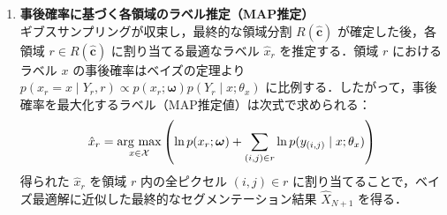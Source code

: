 \documentclass{jsarticle}
\theoremstyle{definition}
\newcommand{\argmax}{\mathop{\rm arg~max}}
\begin{document}
\begin{enumerate}
\begin{proof}
\begin{enumerate}
  結合状態$\bm{c}_{-s}$の段階で$s$と$s'$が同じ領域に属しているか，もしくは$s' = s(c_s = s; リンク先として自身を選択する)$の時，新たな結合によって領域の形状は変わらない．
  \begin{align}
    R(\bm{c}) = R(\bm{c}_{-s})
  \end{align}
  以下，$r=r_s(\bm{c}_{-s})$としたとき，尤度は次のように計算できる．
  \begin{align}
  \prod_{k \in R(\bm{c})} p(Y_k) = p(Y_{r}) \prod_{k \in R(\bm{c}_{-s}) \setminus \{r\}} p(Y_k)
  \end{align}
  よって，
  \begin{align}
  p(c_s=s' \mid \dots)  &\propto p(c_s=s' \mid \hat{T}) p(Y_{r})  \prod_{k \in R(\bm{c}_{-s})} p(Y_k) \\
  &\propto p(c_s=s' \mid \hat{T}) \frac{p(Y_{r})  \prod_{k \in R(\bm{c}_{-s})} p(Y_k)}{p(Y_r)\prod_{k \in R(\bm{c}_{-s})} p(Y_k)} \\
  &= p(c_s=s' \mid \hat{T})
  \end{align}
\end{enumerate}
\end{proof}


  以上の処理を全葉ノードに対して反復し，事後分布への収束を図る．毎ステップ画像全体の尤度を再計算するのではなく，$r_s(\bm{c}_{-s}) \neq r_{s'}(\bm{c}_{-s})$の場合のみ尤度比を計算するため，計算コストを大幅に削減できる．

  \item \textbf{事後確率に基づく各領域のラベル推定（MAP推定）}\\
  ギブスサンプリングが収束し，最終的な領域分割 $R(\hat{\bm{c}})$ が確定した後，各領域 $r \in R(\hat{\bm{c}})$ に割り当てる最適なラベル $\hat{x}_r$ を推定する．領域 $r$ におけるラベル $x$ の事後確率はベイズの定理より $p(x_r = x \mid Y_r, r) \propto p(x_r;\bm{\omega}) p(Y_r \mid x; \theta_x)$ に比例する．したがって，事後確率を最大化するラベル（MAP推定値）は次式で求められる：
  \begin{equation}
    \hat{x}_r = \argmax_{x \in \mathcal{X}} \left( \ln p(x_r;\bm{\omega}) + \sum_{(i,j) \in r} \ln p(y_{(i,j)} \mid x; \theta_x) \right)
  \end{equation}
  得られた $\hat{x}_r$ を領域 $r$ 内の全ピクセル $(i,j) \in r$ に割り当てることで，ベイズ最適解に近似した最終的なセグメンテーション結果 $\hat{X}_{N+1}$ を得る．
\end{enumerate}
\end{document}
